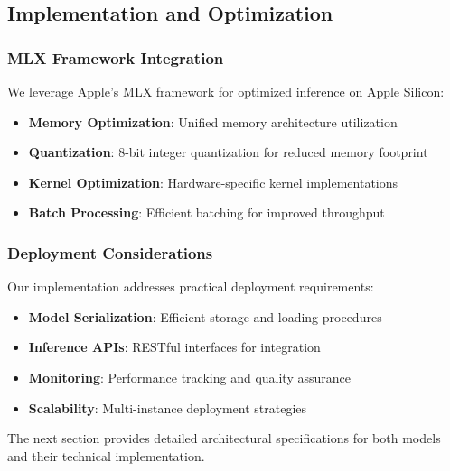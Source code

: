 \subsection{Implementation and Optimization}

\subsubsection{MLX Framework Integration}
We leverage Apple's MLX framework for optimized inference on Apple Silicon:

\begin{itemize}
    \item \textbf{Memory Optimization}: Unified memory architecture utilization
    \item \textbf{Quantization}: 8-bit integer quantization for reduced memory footprint
    \item \textbf{Kernel Optimization}: Hardware-specific kernel implementations
    \item \textbf{Batch Processing}: Efficient batching for improved throughput
\end{itemize}

\subsubsection{Deployment Considerations}
Our implementation addresses practical deployment requirements:

\begin{itemize}
    \item \textbf{Model Serialization}: Efficient storage and loading procedures
    \item \textbf{Inference APIs}: RESTful interfaces for integration
    \item \textbf{Monitoring}: Performance tracking and quality assurance
    \item \textbf{Scalability}: Multi-instance deployment strategies
\end{itemize}

The next section provides detailed architectural specifications for both models and their technical implementation.